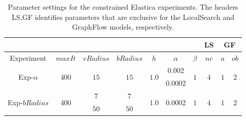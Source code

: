\begin{table}
\centering
\begin{tabular}{|c|c|c|c|c|c|c|c|c|c|}
\cline{8-10}
\multicolumn{7}{c|}{} & LS & \multicolumn{2}{|c|}{GF}\\
\hline
Experiment & $maxIt$ & $vRadius$ & $bRadius$ & $h$ & $\alpha$ & $\beta$  & $nc$ & $a$ & $ob$ \\
\hline
\multirow{2}{*}{Exp-$\alpha$} & \multirow{2}{*}{$400$} & \multirow{2}{*}{$15$} & \multirow{2}{*}{$15$} & \multirow{2}{*}{$1.0$} & $0.002$ & \multirow{2}{*}{$1$}  & \multirow{2}{*}{$4$} & \multirow{2}{*}{$1$} & \multirow{2}{*}{$2$} \\
& & & & & $0.0002$ & & &\\
\hline
\multirow{2}{*}{Exp-$bRadius$} & \multirow{2}{*}{$400$} & $7$ & $7$ & \multirow{2}{*}{$1.0$} & \multirow{2}{*}{$0.0002$} & \multirow{2}{*}{$1$}  & \multirow{2}{*}{$4$} & \multirow{2}{*}{$1$} & \multirow{2}{*}{$2$} \\
& & $50$ & $50$ & & & & &\\
\hline
\end{tabular}
\caption{Parameter settings for the constrained Elastica experiments. The headers LS,GF identifies parameters that are exclusive for the LocalSearch and GraphFlow models, respectively.}
\label{ch9:tab:constrained-elastica-parameters-summary}
\end{table}

